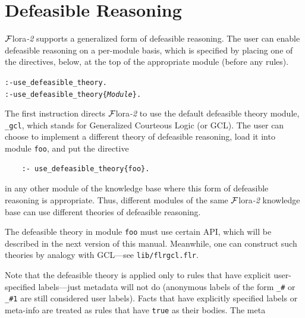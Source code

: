 \documentclass[11pt]{article}
\newcommand{\FLORA}{{\mbox{\sc ${\cal F}${lora}\rm\emph{-2}}}\xspace}
\begin{document}
\section{Defeasible Reasoning}
\label{sec-defeasible}

\FLORA supports a generalized form of defeasible reasoning.
The user can enable defeasible reasoning on a per-module basis, which is
specified by placing one of the directives, below, at the top of the
appropriate module (before any rules).

\begin{alltt}
  :- use_defeasible_theory.
  :- use_defeasible_theory\{\emph{Module}\}.
\end{alltt}
The first instruction directs \FLORA to use the default defeasible theory
module, {\tt \_gcl}, which stands for Generalized Courteous Logic (or GCL).
The user can choose to implement a different theory of defeasible reasoning,
load it into module {\tt foo}, and put the directive
\begin{verbatim}
    :- use_defeasible_theory{foo}.
\end{verbatim}
in any other module of the knowledge base where this form of defeasible
reasoning is appropriate. Thus, different modules of the same \FLORA
knowledge base can use different theories of defeasible reasoning.

The defeasible theory in module {\tt foo} must use certain API, which will
be described in the next version of this manual. Meanwhile, one can
construct such theories by analogy with GCL---see {\tt lib/flrgcl.flr}.  

Note that the defeasible theory is applied only to rules that have explicit
user-specified labels---just metadata will not do (anonymous labels of the
form {\tt \_\#} or {\tt \_\#1} are still considered user labels). Facts
that have explicitly specified labels or meta-info are treated as rules
that have {\tt true} as their bodies.  The meta
\end{document}
